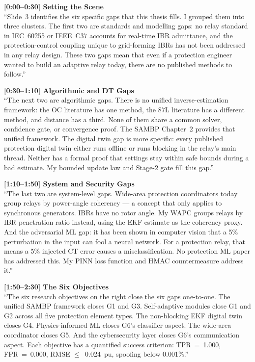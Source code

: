 \documentclass[12pt,a4paper]{article}
\begin{document}
\begin{speakbox}
\textbf{[0:00--0:30] Setting the Scene}\\
``Slide~3 identifies the six specific gaps that this thesis fills.  I grouped them
into three clusters.  The first two are standards and modelling gaps: no relay
standard in IEC~60255 or IEEE~C37 accounts for real-time IBR admittance, and the
protection-control coupling unique to grid-forming IBRs has not been addressed in
any relay design.  These two gaps mean that even if a protection engineer wanted
to build an adaptive relay today, there are no published methods to follow.''

\medskip
\textbf{[0:30--1:10] Algorithmic and DT Gaps}\\
``The next two are algorithmic gaps.  There is no unified inverse-estimation
framework: the OC literature has one method, the 87L literature has a different
method, and distance has a third.  None of them share a common solver, confidence
gate, or convergence proof.  The SAMBP Chapter~2 provides that unified framework.
The digital twin gap is more specific: every published protection digital twin
either runs offline or runs blocking in the relay's main thread.  Neither has a
formal proof that settings stay within safe bounds during a bad estimate.  My
bounded update law and Stage-2 gate fill this gap.''

\medskip
\textbf{[1:10--1:50] System and Security Gaps}\\
``The last two are system-level gaps.  Wide-area protection coordinators today
group relays by power-angle coherency --- a concept that only applies to synchronous
generators.  IBRs have no rotor angle.  My WAPC groups relays by IBR penetration
ratio instead, using the EKF estimate as the coherency proxy.  And the adversarial
ML gap: it has been shown in computer vision that a 5\% perturbation in the input
can fool a neural network.  For a protection relay, that means a 5\% injected CT
error causes a misclassification.  No protection ML paper has addressed this.
My PINN loss function and HMAC countermeasure address it.''

\medskip
\textbf{[1:50--2:30] The Six Objectives}\\
``The six research objectives on the right close the six gaps one-to-one.  The
unified SAMBP framework closes G1 and G3.  Self-adaptive modules close G1 and G2
across all five protection element types.  The non-blocking EKF digital twin closes
G4.  Physics-informed ML closes G6's classifier aspect.  The wide-area coordinator
closes G5.  And the cybersecurity layer closes G6's communication aspect.  Each
objective has a quantified success criterion: TPR~=~1.000, FPR~=~0.000, RMSE
$\leq$~0.024~pu, spoofing below 0.001\%.''


\end{speakbox}
\end{document}
